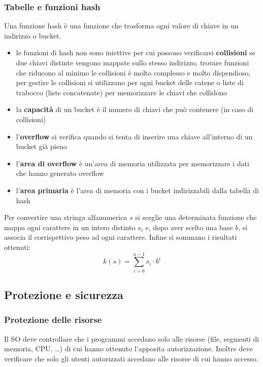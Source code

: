 \documentclass[a4paper]{article}
\begin{document}
\subsubsection*{Tabelle e funzioni hash}
Una funzione hash è una funzione che trasforma ogni valore di chiave in un indirizzo o bucket.
\begin{itemize}
	\item le funzioni di hash non sono iniettive per cui possono verificarsi \textbf{collisioni} se due chiavi distinte vengono
	mappate sullo stesso indirizzo, trovare funzioni che riducono al minimo le collisioni è molto complesso e molto dispendioso,
	per gestire le collisioni si utilizzano per ogni bucket delle catene o liste di trabocco (liste concatenate) per memorizzare
	le chiavi che collidono 
	\item la \textbf{capacità} di un bucket è il numero di chiavi che può contenere (in caso di collisioni)
	\item l'\textbf{overflow} si verifica quando si tenta di inserire una chiave all'interno di un bucket già pieno
	\item l'\textbf{area di overflow} è un'area di memoria utilizzata per memorizzare i dati che hanno generato overflow
	\item l'\textbf{area primaria} è l'area di memoria con i bucket indirizzabili dalla tabella di hash
\end{itemize}
Per convertire una stringa alfanumerica \(s\) si sceglie una determinata funzione che mappa ogni carattere in un intero distinto
\(s_i\) e, dopo aver scelto una base \(b\), si associa il corrispettivo peso ad ogni carattere. Infine si sommano i risultati
ottenuti: \[k(s) = \sum_{i=0}^{n-1} s_i \cdot b^i\]



\subsection{Protezione e sicurezza}
\subsubsection*{Protezione delle risorse}
Il SO deve controllare che i programmi accedano solo alle risorse (file, segmenti di memoria, CPU, \dots) di cui hanno ottenuto
l'apposita autorizzazione. Inoltre deve verificare che solo gli utenti autorizzati accedano alle risorse di cui hanno accesso.
\end{document}
